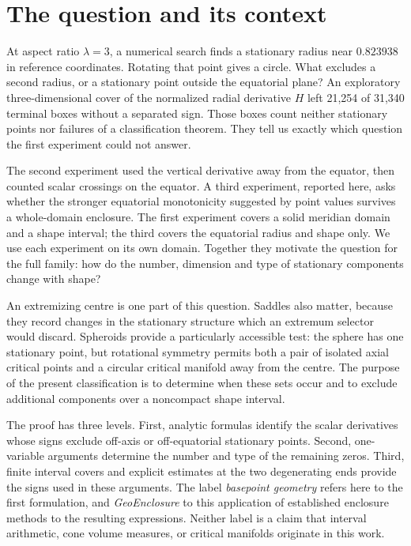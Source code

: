 \section{The question and its context}\label{sec:introduction}

At aspect ratio $\lambda=3$, a numerical search finds a stationary radius near $0.823938$ in reference coordinates. Rotating that point gives a circle. What excludes a second radius, or a stationary point outside the equatorial plane? An exploratory three-dimensional cover of the normalized radial derivative $H$ left 21,254 of 31,340 terminal boxes without a separated sign. Those boxes count neither stationary points nor failures of a classification theorem. They tell us exactly which question the first experiment could not answer.

The second experiment used the vertical derivative away from the equator, then counted scalar crossings on the equator. A third experiment, reported here, asks whether the stronger equatorial monotonicity suggested by point values survives a whole-domain enclosure. The first experiment covers a solid meridian domain and a shape interval; the third covers the equatorial radius and shape only. We use each experiment on its own domain. Together they motivate the question for the full family: how do the number, dimension and type of stationary components change with shape?

An extremizing centre is one part of this question. Saddles also matter, because they record changes in the stationary structure which an extremum selector would discard. Spheroids provide a particularly accessible test: the sphere has one stationary point, but rotational symmetry permits both a pair of isolated axial critical points and a circular critical manifold away from the centre. The purpose of the present classification is to determine when these sets occur and to exclude additional components over a noncompact shape interval.



The proof has three levels. First, analytic formulas identify the scalar derivatives whose signs exclude off-axis or off-equatorial stationary points. Second, one-variable arguments determine the number and type of the remaining zeros. Third, finite interval covers and explicit estimates at the two degenerating ends provide the signs used in these arguments. The label \emph{basepoint geometry} refers here to the first formulation, and \emph{GeoEnclosure} to this application of established enclosure methods to the resulting expressions. Neither label is a claim that interval arithmetic, cone volume measures, or critical manifolds originate in this work.

